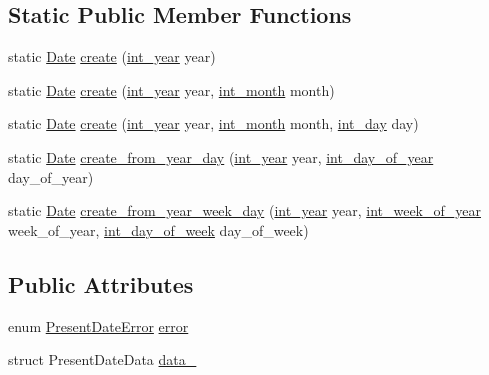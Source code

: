 \subsection*{\-Static \-Public \-Member \-Functions}
\begin{DoxyCompactItemize}
\item 
static \hyperlink{structDate}{\-Date} \hyperlink{structDate_af6a6aa2e75464311dc7eee91e25aee47}{create} (\hyperlink{types_8h_a5b021e50b656f4efcc69340c01a17997}{int\-\_\-year} year)
\item 
static \hyperlink{structDate}{\-Date} \hyperlink{structDate_a0b1280e69ec6310ec8cdfb730e8dd7f6}{create} (\hyperlink{types_8h_a5b021e50b656f4efcc69340c01a17997}{int\-\_\-year} year, \hyperlink{types_8h_ae68f4f515f242b927830881ea4cffae2}{int\-\_\-month} month)
\item 
static \hyperlink{structDate}{\-Date} \hyperlink{structDate_ae0bcc2332237bf0f5b57ed646a00e6ac}{create} (\hyperlink{types_8h_a5b021e50b656f4efcc69340c01a17997}{int\-\_\-year} year, \hyperlink{types_8h_ae68f4f515f242b927830881ea4cffae2}{int\-\_\-month} month, \hyperlink{types_8h_a5269b564286b0eecff0b944afb81d4e2}{int\-\_\-day} day)
\item 
static \hyperlink{structDate}{\-Date} \hyperlink{structDate_afed458a3a1ff055cebdbd153bb00d5a4}{create\-\_\-from\-\_\-year\-\_\-day} (\hyperlink{types_8h_a5b021e50b656f4efcc69340c01a17997}{int\-\_\-year} year, \hyperlink{types_8h_aaaf288114a6279e071420e8e20324b13}{int\-\_\-day\-\_\-of\-\_\-year} day\-\_\-of\-\_\-year)
\item 
static \hyperlink{structDate}{\-Date} \hyperlink{structDate_a282993d00829e727eac88615cb2f1146}{create\-\_\-from\-\_\-year\-\_\-week\-\_\-day} (\hyperlink{types_8h_a5b021e50b656f4efcc69340c01a17997}{int\-\_\-year} year, \hyperlink{types_8h_a8f4ececac5f6a2cb2ec9ba25de8e996b}{int\-\_\-week\-\_\-of\-\_\-year} week\-\_\-of\-\_\-year, \hyperlink{types_8h_a8132950de7fc3f98373a4d384d8b6eca}{int\-\_\-day\-\_\-of\-\_\-week} day\-\_\-of\-\_\-week)
\end{DoxyCompactItemize}
\subsection*{\-Public \-Attributes}
\begin{DoxyCompactItemize}
\item 
enum \hyperlink{date_8h_a42798e6b91456e88f492437d3e826c0b}{\-Present\-Date\-Error} \hyperlink{structDate_adb2a42cb857f6462788b856b2f60cfb2}{error}
\item 
struct \-Present\-Date\-Data \hyperlink{structDate_a15a7ce699435bf3c9c60bfff5e1806de}{data\-\_\-}
\end{DoxyCompactItemize}
